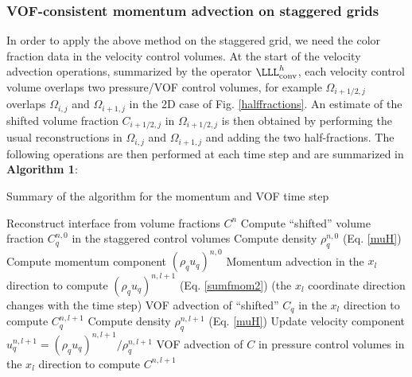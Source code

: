 \subsubsection{VOF-consistent momentum advection on staggered grids}

In order to apply the above method on the staggered grid, we need
the color fraction data in the velocity control volumes. 
At the start of the velocity advection operations, summarized by the operator 
$\LLL^h_{\rm conv}$, each velocity control volume overlaps two pressure/VOF 
control volumes, for example $\Omega_{i+1/2,j}$ overlaps $\Omega_{i,j}$ and $\Omega_{i+1,j}$ 
in the 2D case of Fig. \ref{halffractions}. An estimate of the shifted volume fraction
$C_{i+1/2,j}$ in $\Omega_{i+1/2,j}$ is then obtained by performing the usual reconstructions
in $\Omega_{i,j}$ and $\Omega_{i+1,j}$  and adding the two half-fractions.
The following operations are then performed at each time step and are summarized
in \textbf{Algorithm 1}:

\begin{algorithm}
\caption{Summary of the algorithm for the momentum and VOF time step}
\label{resumealgo}
\begin{algorithmic}[]
   \State Reconstruct interface from volume fractions $C^{n}$
      \State Compute ``shifted'' volume fraction $C^{n,0}_q$ in the staggered control volumes 
      \State Compute density $\rho^{n,0}_q$ (Eq. \ref{muH})
      \State Compute momentum component $(\rho_q u_q)^{n,0}$
   \EndFor
         \State Momentum advection in the $x_l$ direction to compute $(\rho_q u_q)^{n,l+1}$ 
                (Eq. \ref{sumfmom2})
         \State (the $x_l$ coordinate direction changes with the time step)
         \State VOF advection of ``shifted'' $C_q$ in the $x_l$ direction to compute 
                $C^{n,l+1}_q$
         \State Compute density $\rho^{n,l+1}_q$ (Eq. \ref{muH})
         \State Update velocity component $u_q^{n,l+1} = (\rho_q u_q)^{n,l+1}/\rho^{n,l+1}_q$
      \EndFor
      \State VOF advection of $C$ in pressure control volumes in the $x_l$ direction
             to compute 
      \State $C^{n,l+1}$
   \EndFor
\end{algorithmic}
\end{algorithm}

